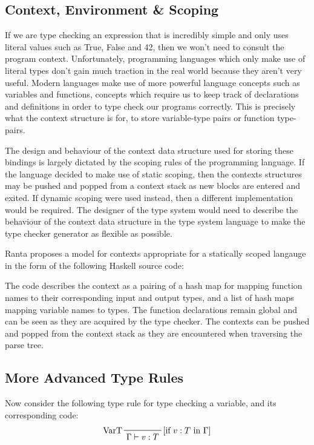\documentclass{UoYCSproject}
\begin{document}
\subsection{Context, Environment \& Scoping}
If we are type checking an expression that is incredibly simple and only uses
literal values such as True, False and 42, then we won't need to consult the
program context. Unfortunately, programming languages which only make use of
literal types don't gain much traction in the real world because they aren't
very useful. Modern languages make use of more powerful language concepts such
as variables and functions, concepts which require us to keep track of
declarations and definitions in order to type check our programs correctly.
This is precisely what the context structure is for, to store variable-type
pairs or function type-pairs.

The design and behaviour of the context data structure used for storing these
bindings is largely dictated by the scoping rules of the programming language.
If the language decided to make use of static scoping, then the contexts
structures may be pushed and popped from a context stack as new blocks are
entered and exited. If dynamic scoping were used instead, then a different
implementation would be required. The designer of the type system would need
to describe the behaviour of the context data structure in the type system
language to make the type checker generator as flexible as possible.

Ranta \cite{Ranta} proposes a model for contexts appropriate for a statically
scoped langauge in the form of the following Haskell source code:

The code describes the context as a pairing of a hash map for mapping function
names to their corresponding input and output types, and a list of hash maps
mapping variable names to types. The function declarations remain global and can
be seen as they are acquired by the type checker. The contexts can be pushed
and popped from the context stack as they are encountered when traversing the
parse tree.

\subsection{More Advanced Type Rules}
Now consider the following type rule for type checking a variable, and its
corresponding code:
\begin{displaymath}
    \prftree[l,r]{[if $v:T$ in $\Gamma$]}{VarT}{\Gamma \vdash v:T}
\end{displaymath}
\end{document}
